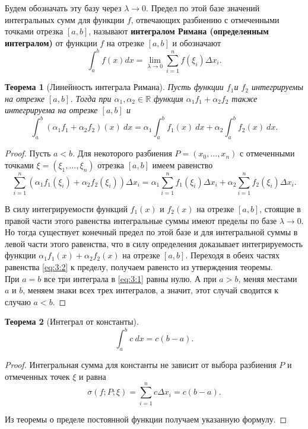 \documentclass[12pt]{article}
\numberwithin{equation}{section}
\newtheorem{theorem}{Теорема}[section]
\begin{document}
Будем обозначать эту базу через $\lambda \to 0$. Предел по этой базе значений интегральных сумм для функции $f$, отвечающих разбиению с отмеченными точками отрезка $[a,b]$, называют \textbf{интегралом Римана (определенным интегралом)} от функции $f$ на отрезке $[a,b]$ и обозначают
\[ \int_{a}^b f(x) dx = \lim_{\lambda \to 0}\sum_{i=1}^n f(\xi_i) \Delta x_i.\]

\begin{theorem}[Линейность интеграла Римана] Пусть функции $f_1$и $f_2$ интегрируемы на отрезке $[a,b]$. Тогда при $\alpha_1, \alpha_2 \in \mathbb{R}$ функция $\alpha_1 f_1 + \alpha_2 f_2 $ также интегрируема на отрезке $[a,b]$ и 
\begin{equation}\label{eq:3:1}
\int_a^b (\alpha_1 f_1 + \alpha_2 f_2) (x) ~dx = \alpha_1 \int_a^b f_1(x) ~dx + \alpha_2 \int_a^b f_2(x)~dx. 
\end{equation}
\end{theorem}
\begin{proof} Пусть $a < b$. Для некоторого разбиения $P = (x_0, \ldots, x_n)$ с отмеченными точками $\xi = (\xi_1, \ldots, \xi_n)$ отрезка $[a,b]$ имеем равенство
\begin{equation}\label{eq:3:2}
\sum_{i=1}^n(\alpha_1f_1(\xi_i) + \alpha_2 f_2 (\xi_i))\Delta x_i = \alpha_1 \sum_{i=1}^n f_1 (\xi_i) \Delta x_i + \alpha_2 \sum_{i=1}^n f_2 (\xi_i) \Delta x_i.
\end{equation}

В силу интегрируемости функций $f_1(x)$ и $f_2(x)$ на отрезке $[a,b]$, стоящие в правой части этого равенства интегральные суммы имеют пределы по базе $\lambda \to 0$. Но тогда существует конечный предел по этой базе и для интегральной суммы в левой части этого равенства, что в силу определения доказывает интегрируемость функции $\alpha_1f_1(x) + \alpha_2 f_2(x)$ на отрезке $[a,b]$. Переходя в обеих частях равенства \eqref{eq:3:2} к пределу, получаем равенсто из утверждения теоремы.\\

При $a = b$ все три интеграла в \eqref{eq:3:1} равны нулю. А при $a > b$, меняя местами $a$ и $b$, меняем знаки всех трех интегралов, а значит, этот случай сводится к случаю $a < b$.
\end{proof}

\begin{theorem}[Интеграл от константы]
\[ \int_a^b c~dx = c(b-a).\]
\end{theorem}
\begin{proof}
Интегральная сумма для константы не зависит от выбора разбиения $P$ и отмеченных точек $\xi$ и равна
\[ \sigma(f;P;\xi) = \sum_{i=1}^n c\Delta x_i = c(b-a).\]

Из теоремы о пределе постоянной функции получаем указанную формулу.
\end{proof}
\end{document}
